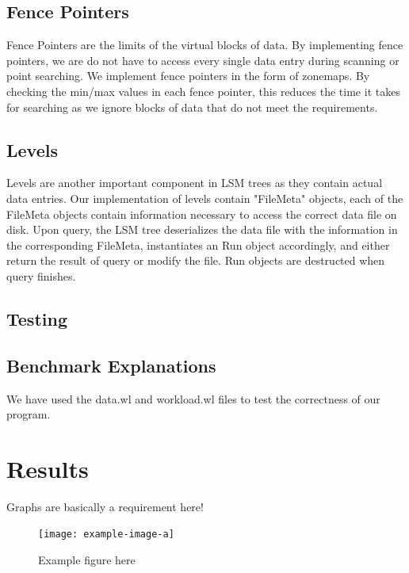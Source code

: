 \documentclass[sigconf]{acmart}
\begin{document}
    \subsection{Fence Pointers}
    Fence Pointers are the limits of the virtual blocks of data. By implementing fence pointers, we are do not have to access every single data entry during scanning or point searching. We implement fence pointers in the form of zonemaps. By checking the min/max values in each fence pointer, this reduces the time it takes for searching as we ignore blocks of data that do not meet the requirements.

    \subsection{Levels}
    Levels are another important component in LSM trees as they contain actual data entries. Our implementation of levels contain "FileMeta" objects, each of the FileMeta objects contain information necessary to access the correct data file on disk. Upon query, the LSM tree deserializes the data file with the information in the corresponding FileMeta, instantiates an Run object accordingly, and either return the result of query or modify the file. Run objects are destructed when query finishes.

    \subsection{Testing}

    \subsection{Benchmark Explanations}

    We have used the data.wl and workload.wl files to test the correctness of our program.


    \section{Results}
    Graphs are basically a requirement here!

    \begin{figure}[ht]
        \texttt{[image: example-image-a]}
        \caption{Example figure here}
        \label{fig:filler}
    \end{figure}
\end{document}
